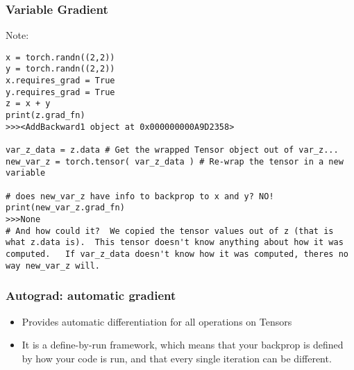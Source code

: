  
\begin{frame}[fragile]
\frametitle{Variable Gradient}
Note:
 \begin{lstlisting}
x = torch.randn((2,2))
y = torch.randn((2,2))
x.requires_grad = True
y.requires_grad = True
z = x + y 
print(z.grad_fn)
>>><AddBackward1 object at 0x000000000A9D2358>

var_z_data = z.data # Get the wrapped Tensor object out of var_z...
new_var_z = torch.tensor( var_z_data ) # Re-wrap the tensor in a new variable

# does new_var_z have info to backprop to x and y? NO!
print(new_var_z.grad_fn)
>>>None
# And how could it?  We copied the tensor values out of z (that is what z.data is).  This tensor doesn't know anything about how it was computed.   If var_z_data doesn't know how it was computed, theres no way new_var_z will.
\end{lstlisting}

\end{frame} 
 

\begin{frame}[fragile] \frametitle{Autograd: automatic gradient}
\begin{itemize}
\item Provides automatic differentiation for all operations on Tensors
\item It is a define-by-run framework, which means that your backprop is defined by how your code is run, and that every single iteration can be different.
\end{itemize}
\end{frame}

